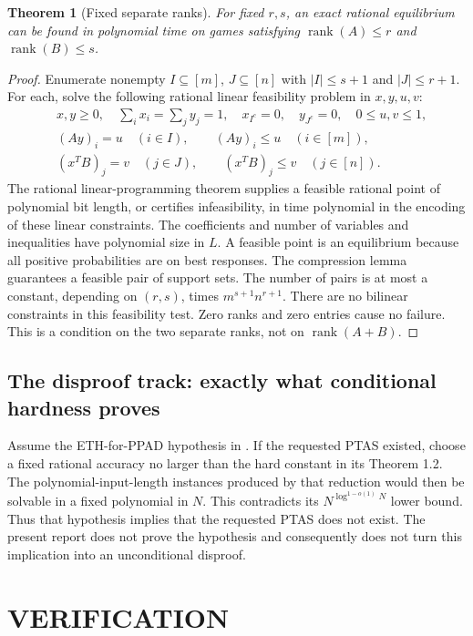 \documentclass[11pt,a4paper]{article}
\newtheorem{theorem}{Theorem}[section]
\theoremstyle{definition}
\theoremstyle{remark}
\begin{document}
\begin{theorem}[Fixed separate ranks]
For fixed $r,s$, an exact rational equilibrium can be found in polynomial time on games satisfying $\operatorname{rank}(A)\leq r$ and $\operatorname{rank}(B)\leq s$.
\end{theorem}
\begin{proof}
Enumerate nonempty $I\subseteq[m]$, $J\subseteq[n]$ with $|I|\leq s+1$ and $|J|\leq r+1$. For each, solve the following rational linear feasibility problem in $x,y,u,v$:
\begin{align*}
 &x,y\geq0,\quad \sum_i x_i=\sum_jy_j=1,
   \quad x_{I^c}=0,\quad y_{J^c}=0,\quad 0\leq u,v\leq1,\\
 &(Ay)_i=u\quad(i\in I),\qquad (Ay)_i\leq u\quad(i\in[m]),\\
 &(x^TB)_j=v\quad(j\in J),\qquad (x^TB)_j\leq v\quad(j\in[n]).
\end{align*}
The rational linear-programming theorem supplies a feasible rational point of polynomial bit length, or certifies infeasibility, in time polynomial in the encoding of these linear constraints. The coefficients and number of variables and inequalities have polynomial size in $L$. A feasible point is an equilibrium because all positive probabilities are on best responses. The compression lemma guarantees a feasible pair of support sets. The number of pairs is at most a constant, depending on $(r,s)$, times $m^{s+1}n^{r+1}$. There are no bilinear constraints in this feasibility test. Zero ranks and zero entries cause no failure. This is a condition on the two separate ranks, not on $\operatorname{rank}(A+B)$.
\end{proof}

\subsection{The disproof track: exactly what conditional hardness proves}
Assume the ETH-for-PPAD hypothesis in \cite{c72-rub}. If the requested PTAS existed, choose a fixed rational accuracy no larger than the hard constant in its Theorem 1.2. The polynomial-input-length instances produced by that reduction would then be solvable in a fixed polynomial in $N$. This contradicts its $N^{\log^{1-o(1)}N}$ lower bound. Thus that hypothesis implies that the requested PTAS does not exist. The present report does not prove the hypothesis and consequently does not turn this implication into an unconditional disproof.

\section{VERIFICATION}
\end{document}
